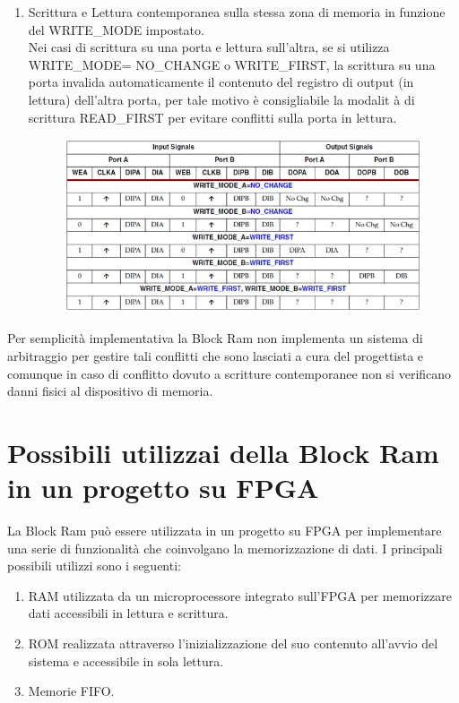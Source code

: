 \begin{enumerate}
	\item Scrittura e Lettura contemporanea sulla stessa zona di memoria in funzione del WRITE\_MODE impostato.\\
Nei casi di scrittura su una porta e lettura sull'altra, se si utilizza WRITE\_MODE= NO\_CHANGE o WRITE\_FIRST, la scrittura su una porta invalida automaticamente il contenuto del registro di output (in lettura) dell'altra porta, per tale motivo  \`e consigliabile la modalit \`a di scrittura READ\_FIRST per evitare conflitti sulla porta in lettura.

\begin{figure}[!h]
\centering
\includegraphics[width=\textwidth]{img/blockRam/conflittiScritture.jpg}
\label{fig:set_ass}
\end{figure}

\end{enumerate}

Per semplicit\`a implementativa la Block Ram non implementa un sistema di arbitraggio per gestire tali conflitti che sono lasciati a cura del progettista e comunque in caso di conflitto dovuto a scritture contemporanee non si verificano danni fisici al dispositivo di memoria. 

\section{Possibili utilizzai della Block Ram in un progetto su FPGA}
La Block Ram pu\`o essere utilizzata in un progetto su FPGA per implementare una serie di funzionalit\`a che coinvolgano la memorizzazione di dati. I principali possibili utilizzi sono i seguenti:
\begin{enumerate}
\item RAM utilizzata da un microprocessore integrato sull'FPGA per memorizzare dati accessibili in lettura e scrittura.
\item ROM realizzata attraverso l'inizializzazione del suo contenuto all'avvio del sistema e accessibile in sola lettura.
\item Memorie FIFO.
\end{enumerate}

